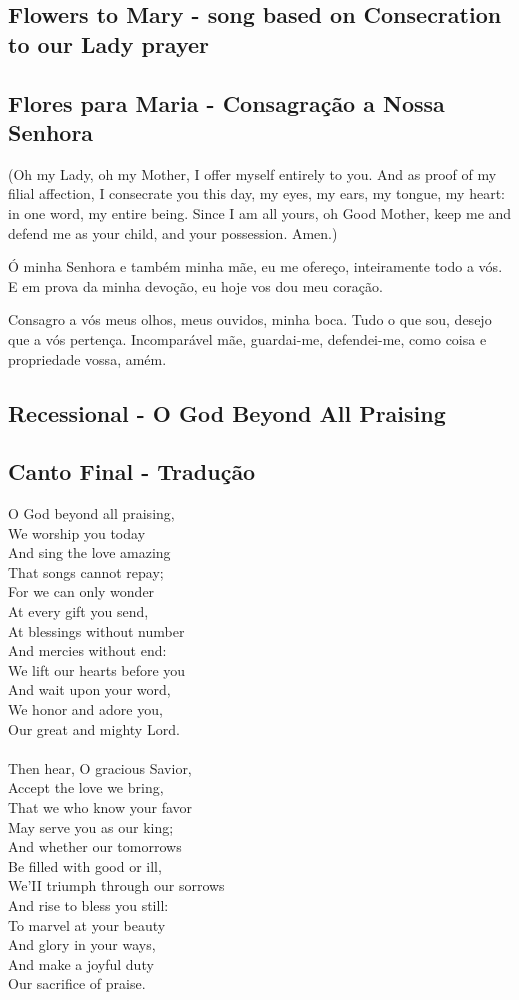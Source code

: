 \documentclass[10pt,a5]{article}
\newcommand \subsect[2] {\subsection*{#1} \switchcolumn \subsection*{#2} \switchcolumn*}
\begin{document}
\begin{paracol}{2}
\subsect{Flowers to Mary - song based on Consecration to our Lady prayer}{Flores para Maria - Consagra\c{c}\~ao a Nossa Senhora}

(Oh my Lady, oh my Mother,
I offer myself entirely to you.
And as proof of my filial affection,
I consecrate you this day,
my eyes, my ears, my tongue, my heart:
in one word, my entire being.
Since I am all yours,
oh Good Mother,
keep me and defend me as your child,
and your possession. Amen.)

\switchcolumn

Ó minha Senhora e também minha mãe,
eu me ofereço, inteiramente todo a vós.
E em prova da minha devoção,
eu hoje vos dou meu coração.

Consagro a vós meus olhos, meus ouvidos, minha boca.
Tudo o que sou, desejo que a vós pertença.
Incomparável mãe, guardai-me, defendei-me,
como coisa e propriedade vossa, amém.

\switchcolumn*

\subsect{Recessional - O God Beyond All Praising}{Canto Final - Tradu\c{c}\~ao}

O God beyond all praising,\\
We worship you today\\
And sing the love amazing\\
That songs cannot repay;\\
For we can only wonder\\
At every gift you send,\\
At blessings without number\\
And mercies without end:\\
We lift our hearts before you\\
And wait upon your word,\\
We honor and adore you,\\
Our great and mighty Lord.\\
\\
Then hear, O gracious Savior,\\
Accept the love we bring,\\
That we who know your favor\\
May serve you as our king;\\
And whether our tomorrows\\
Be filled with good or ill,\\
We'II triumph through our sorrows\\
And rise to bless you still:\\
To marvel at your beauty\\
And glory in your ways,\\
And make a joyful duty\\
Our sacrifice of praise.\\


\end{paracol}
\end{document}
